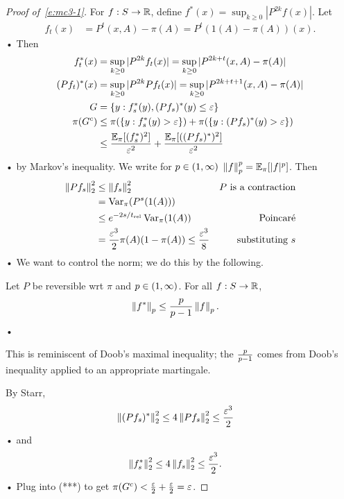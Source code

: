 \begin{proof}[Proof of~\eqref{e:mc3-1}]
For $f:S\to \mathbb{R}$, define $f^*(x) = \sup_{k\ge 0}|P^{2k}f(x)|$. Let
\begin{align*}
f_t(x) &= P^t(x,A) - \pi(A) = P^t(1(A)-\pi(A))(x).
\end{align*}•
Then
\begin{align*}
f_t^*(x) &= \sup_{k\ge 0}|P^{2k}f_t(x)| = \sup_{k\ge 0} |P^{2k+t}(x,A)-\pi(A)|\\
(Pf_t)^*(x) &= \sup_{k\ge 0} |P^{2k} Pf_t(x)| = \sup_{k\ge 0}|P^{2k+t+1}(x,A)-\pi(A)|\\
G&= \left\{{y}:{f_s^*(y), (Pf_s)^*(y)\le \varepsilon}\right\}\\
\pi(G^c) &\le \pi(\left\{{y}:{f_s^*(y)>\varepsilon}\right\}) + \pi(\left\{{y}:{(Pf_s)^*(y)>\varepsilon}\right\})\\
&\le \frac{\mathbb{E}_\pi[(f_s^*)^2]}{\varepsilon^2} + \frac{\mathbb{E}_\pi[((Pf_s)^*)^2]}{\varepsilon^2}
\end{align*}•
by Markov's inequality.
We write for $p\in (1,\infty)$ $\left\Vert {f}\right\Vert_p^p=\mathbb{E}_\pi[|f|^p]$. Then
\begin{align*}
\left\Vert {Pf_s}\right\Vert_2^2 &\le \left\Vert {f_s}\right\Vert_2^2 &P\text{ is a contraction}\\
&=\operatorname{Var}_\pi(P^s(1(A)))\\
&\le e^{-2s/t_{\text{rel}}} \operatorname{Var}_\pi(1(A)) & \text{Poincar\'e}\\
&=\frac{\varepsilon^3}{2} \pi(A)(1-\pi(A)) \le \frac{\varepsilon^3}{8} &\text{substituting }s
\end{align*}•
We want to control the norm; we do this by the following.
\begin{thm}
Let $P$ be reversible wrt $\pi$ and $p\in (1,\infty)$. For all $f:S\to \mathbb{R}$, 
\begin{align*}
\left\Vert {f^*}\right\Vert_p &\le \frac{p}{p-1} \left\Vert {f}\right\Vert_p.
\end{align*}•
\end{thm}
This is reminiscent of Doob's maximal inequality; the $\frac{p}{p-1}$ comes from Doob's inequality applied to an appropriate martingale.

By Starr,
\begin{align*}
\left\Vert {(Pf_s)^*}\right\Vert_2^2 &\le 4 \left\Vert {Pf_s}\right\Vert_2^2 \le \frac{\varepsilon^3}{2}
\end{align*}•
and 
\begin{align*}
\left\Vert {f_s^*}\right\Vert_2^2 &\le 4 \left\Vert {f_s}\right\Vert_2^2 \le \frac{\varepsilon^3}{2}.
\end{align*}•
Plug into (***) to get $\pi(G^c)<\frac{\varepsilon}{2}+\frac{\varepsilon}{2}=\varepsilon$. 
\end{proof}

